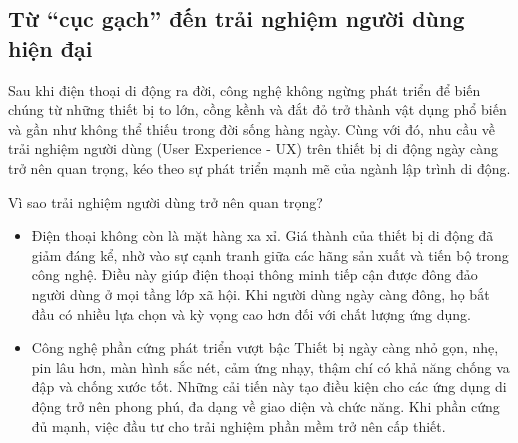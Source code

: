 \subsection{Từ “cục gạch” đến trải nghiệm người dùng hiện đại}
\renewcommand{\labelitemi}{--}    
    \begin{flushleft}
        \hspace*{0.8cm}Sau khi điện thoại di động ra đời, công nghệ không ngừng phát triển để biến chúng từ những thiết bị to lớn, cồng kềnh và đắt đỏ trở thành vật dụng phổ biến và gần như không thể thiếu trong đời sống hàng ngày. Cùng với đó, nhu cầu về trải nghiệm người dùng (User Experience - UX) trên thiết bị di động ngày càng trở nên quan trọng, kéo theo sự phát triển mạnh mẽ của ngành lập trình di động.
    \end{flushleft}

    \begin{flushleft}
      \hspace*{0.8cm}Vì sao trải nghiệm người dùng trở nên quan trọng?
      \setlength{\leftmargini}{1.5cm}
      \begin{itemize}
        \item Điện thoại không còn là mặt hàng xa xỉ. Giá thành của thiết bị di động đã giảm đáng kể, nhờ vào sự cạnh tranh giữa các hãng sản xuất và tiến bộ trong công nghệ. Điều này giúp điện thoại thông minh tiếp cận được đông đảo người dùng ở mọi tầng lớp xã hội. Khi người dùng ngày càng đông, họ bắt đầu có nhiều lựa chọn và kỳ vọng cao hơn đối với chất lượng ứng dụng.
        \item Công nghệ phần cứng phát triển vượt bậc Thiết bị ngày càng nhỏ gọn, nhẹ, pin lâu hơn, màn hình sắc nét, cảm ứng nhạy, thậm chí có khả năng chống va đập và chống xước tốt. Những cải tiến này tạo điều kiện cho các ứng dụng di động trở nên phong phú, đa dạng về giao diện và chức năng. Khi phần cứng đủ mạnh, việc đầu tư cho trải nghiệm phần mềm trở nên cấp thiết.
      \end{itemize}
    \end{flushleft}

